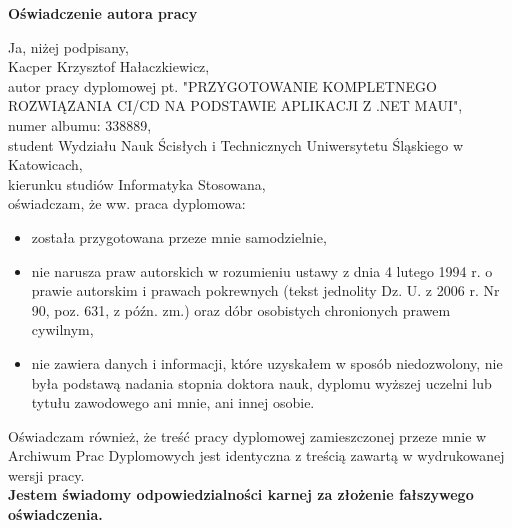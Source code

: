 \textbf{Oświadczenie autora pracy}

Ja, niżej podpisany, \\
Kacper Krzysztof Hałaczkiewicz, \\
autor pracy dyplomowej pt. "PRZYGOTOWANIE KOMPLETNEGO \\
ROZWIĄZANIA CI/CD NA PODSTAWIE APLIKACJI Z .NET MAUI", \\
numer albumu: 338889, \\
student Wydziału Nauk Ścisłych i Technicznych Uniwersytetu Śląskiego w Katowicach, \\
kierunku studiów Informatyka Stosowana, \\
oświadczam, że ww. praca dyplomowa: 
\begin{itemize}
    \item została przygotowana przeze mnie samodzielnie, 
    \item nie narusza praw autorskich w rozumieniu ustawy z dnia 4 lutego 1994 r. o prawie autorskim i prawach pokrewnych (tekst jednolity Dz. U. z 2006 r. Nr 90, poz. 631, z późn. zm.) oraz dóbr osobistych chronionych prawem cywilnym, 
    \item nie zawiera danych i informacji, które uzyskałem w sposób niedozwolony, nie była podstawą nadania stopnia doktora nauk, dyplomu wyższej uczelni lub tytułu zawodowego ani mnie, ani innej osobie. 
\end{itemize}

Oświadczam również, że treść pracy dyplomowej zamieszczonej przeze mnie w Archiwum Prac Dyplomowych 
jest identyczna z treścią zawartą w wydrukowanej wersji pracy. \\
\textbf{Jestem świadomy odpowiedzialności karnej za złożenie fałszywego oświadczenia.}


